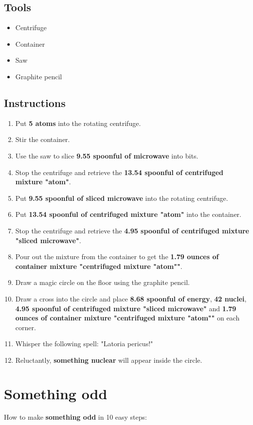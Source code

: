 \documentclass{article}
\begin{document}
\subsection{Tools}\begin{itemize}
\item 
Centrifuge
\item 
Container
\item 
Saw
\item 
Graphite pencil
\end{itemize}
\subsection{Instructions}\begin{enumerate}
\item 
Put \textbf{5 atoms} into the rotating centrifuge.
\item 
Stir the container.
\item 
Use the saw to slice \textbf{9.55 spoonful of microwave} into bits.
\item 
Stop the centrifuge and retrieve the \textbf{13.54 spoonful of centrifuged mixture "atom"}.
\item 
Put \textbf{9.55 spoonful of sliced microwave} into the rotating centrifuge.
\item 
Put \textbf{13.54 spoonful of centrifuged mixture "atom"} into the container.
\item 
Stop the centrifuge and retrieve the \textbf{4.95 spoonful of centrifuged mixture "sliced microwave"}.
\item 
Pour out the mixture from the container to get the \textbf{1.79 ounces of container mixture "centrifuged mixture "atom""}.
\item 
Draw a magic circle on the floor using the graphite pencil.
\item 
Draw a cross into the circle and place \textbf{8.68 spoonful of energy}, \textbf{42 nuclei}, \textbf{4.95 spoonful of centrifuged mixture "sliced microwave"} and \textbf{1.79 ounces of container mixture "centrifuged mixture "atom""} on each corner.
\item 
Whisper the following spell: "Latoria pericus!"
\item 
Reluctantly, \textbf{something nuclear} will appear inside the circle.
\end{enumerate}
\newpage
\section{Something odd}How to make \textbf{something odd} in 10 easy steps:
\end{document}
